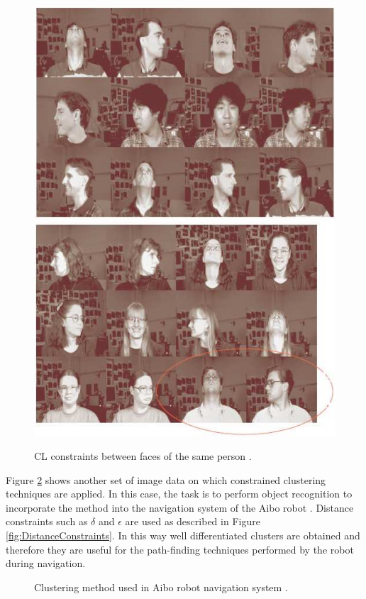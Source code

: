 \begin{figure}[bth]
	\myfloatalign
	{\includegraphics[width=.35\linewidth]{gfx/ConstClust/AnalisisImagenes/CarasDifOr1}} \quad
	{\includegraphics[width=.35\linewidth]{gfx/ConstClust/AnalisisImagenes/CarasDifOr2}}
	\caption[\acs{CL} constraints between faces of the same person.]{\acs{CL} constraints between faces of the same person \cite{davidson2007survey}.}\label{fig:FacesDatabaseCL}
\end{figure}

Figure \ref{fig:AiboRobotClustSys} shows another set of image data on which constrained clustering techniques are applied. In this case, the task is to perform object recognition to incorporate the method into the navigation system of the Aibo robot \cite{davidson2005clustering}. Distance constraints such as $\delta$ and $\epsilon$ are used as described in Figure \ref{fig:DistanceConstraints}. In this way well differentiated clusters are obtained and therefore they are useful for the path-finding techniques performed by the robot during navigation.

\begin{figure}[bth]
	\myfloatalign
	 \quad
	 \quad
	 \quad
	\caption[Clustering method used in Aibo robot navigation system.]{Clustering method used in Aibo robot navigation system \cite{davidson2007survey,davidson2005clustering}.}\label{fig:AiboRobotClustSys}
\end{figure}

